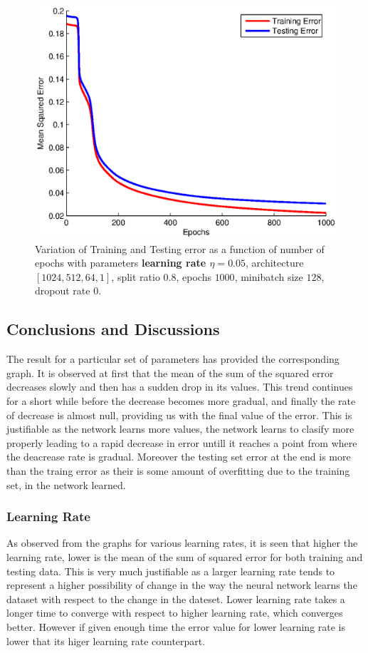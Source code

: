 \documentclass{article}
\newcommand{\myScale}{0.56}
\begin{document}
\begin{figure}[H]
\includegraphics[scale=\myScale]{../q2/part4_0p05}
\caption{Variation of Training and Testing error as a function of number of epochs with parameters {\bf learning rate $\eta=0.05$}, architecture $[1024,512,64,1]$, split ratio $0.8$, epochs $1000$, minibatch size $128$, dropout rate $0$.}
\label{fig:fig25}
\end{figure}
\subsection{Conclusions and Discussions}
The result for a particular set of parameters has provided the corresponding graph. It is observed at first that the mean of the sum of the squared error decreases slowly and then has a sudden drop in its values. This trend continues for a short while before the decrease becomes more gradual, and finally the rate of decrease is almost null, providing us with the final value of the error. This is justifiable as the network learns more values, the network learns to clasify more properly leading to a rapid decrease in error untill it reaches a point from where the deacrease rate is gradual. Moreover the testing set error at the end is more than the traing error as their is some amount of overfitting due to the training set, in the network learned.

\subsubsection{Learning Rate}
As observed from the graphs for various learning rates, it is seen that higher the learning rate, lower is the mean of the sum of squared error for both training and testing data. This is very much justifiable as a larger learning rate tends to represent a higher possibility of change in the way the neural network learns the dataset  with respect to the change in the dateset. Lower learning rate takes a longer time to converge with respect to higher learning rate, which converges better. However if given enough time the error value for lower learning rate is lower that its higer learning rate counterpart.
\end{document}
